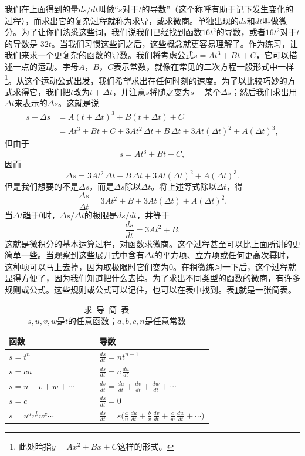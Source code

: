 我们在上面得到的量$ds/dt$叫做“$s$对于$t$的导数”（这个称呼有助于记下发生变化的过程），而求出它的复杂过程就称为求导，或求微商。单独出现的$ds$和$dt$叫做微分。为了让你们熟悉这些词，我们说我们已经找到函数$16t^2$的导数，或者$16t^2$对于$t$的导数是 $32t$。当我们习惯这些词之后，这些概念就更容易理解了。作为练习，让我们来求一个更复杂的函数的导数。我们将考虑公式$s=At^3+Bt+C$，它可以描述一点的运动。字母$A$，$B$，$C$表示常数，就像在常见的二次方程一般形式中一样\footnote{此处暗指$y=Ax^2+Bx+C$这样的形式。}。从这个运动公式出发，我们希望求出在任何时刻的速度。为了以比较巧妙的方式求得它，我们把$t$改为$t+\Delta t$，并注意$s$将随之变为$s+\textrm{某个}\Delta s$；然后我们求出用$\Delta t$来表示的$\Delta s$。这就是说
\begin{align*}
s+\Delta s&=A(t+\Delta t)^3+B(t+\Delta t)+C\\[1ex]
&=At^3+Bt+C+3At^2\,\Delta t+B\,\Delta t+3At(\Delta t)^2+
A(\Delta t)^3,
\end{align*}
但由于
\begin{equation*}
s=At^3+Bt+C,
\end{equation*}
因而
\begin{equation*}
\Delta s=3At^2\,\Delta t+B\,\Delta t+3At(\Delta t)^2+A(\Delta t)^3.
\end{equation*}
但是我们想要的不是$\Delta s$，而是$\Delta s$除以$\Delta t$。将上述等式除以$\Delta t$，得
\begin{equation*}
\frac{\Delta s}{\Delta t}=3At^2+B+3At(\Delta t)+A(\Delta t)^2.
\end{equation*}
当$\Delta t$趋于0时，$\Delta s/\Delta t$的极限是$ds/dt$，并等于
\begin{equation*}
\frac{ds}{dt}=3At^2+B.
\end{equation*}
这就是微积分的基本运算过程，对函数求微商。这个过程甚至可以比上面所讲的更简单一些。当观察到这些展开式中含有$\Delta t$的平方项、立方项或任何更高次幂时，这种项可以马上去掉，因为取极限时它们变为0。在稍微练习一下后，这个过程就显得方便了，因为我们知道把什么去掉。为了求出不同类型的函数的微商，有许多规则或公式。这些规则或公式可以记住，也可以在表中找到。表\ref{tab:8.3}就是一张简表。
\begin{table}[H]
\renewcommand{\arraystretch}{1.5}
\centering
\caption{求~导~简~表 \\{\footnotesize $s, u, v, w$是$t$的任意函数；$a, b, c, n$是任意常数}}
\label{tab:8.3}
\medskip 
\begin{tabular}{@{}ll@{}}
\toprule
函数 & 导数  \\ \midrule
$s=t^n$  & $\frac{ds}{dt}=nt^{n-1}$  \\
$s=cu$  & $\frac{ds}{dt}=c\,\frac{du}{dt}$ \\
$s=u+v+w+\dotsb\qquad $ & $ \frac{ds}{dt}=\frac{du}{dt}+\frac{dv}{dt}+\frac{dw}{dt}+\dotsb$  \\
$s=c$ & $\frac{ds}{dt}=0 $ \\
$s=u^av^bw^c\dotsm$ & $\frac{ds}{dt}=s\biggl(\frac{a}{u}\,\frac{du}{dt}+
\frac{b}{v}\,\frac{dv}{dt}+\frac{c}{w}\,\frac{dw}{dt}+\dotsb\biggr)$
 \\ \bottomrule
\end{tabular}
\end{table}




